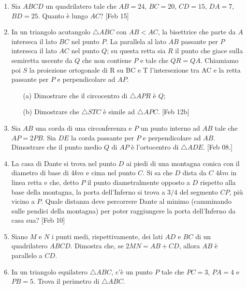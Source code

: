 \documentclass[a4paper]{article}
\theoremstyle{remark}
\theoremstyle{definition}
\begin{document}
\begin{enumerate}
	\item  Sia $ ABCD $ un quadrilatero tale che $ AB = 24 $, $ BC = 20 $, $ CD = 15 $, $ DA = 7 $, $ BD = 25 $. Quanto è lungo $ AC $? [Feb 15] 
	
	\item  In un triangolo acutangolo $ \bigtriangleup ABC $ con $ AB < AC $, la bisettrice che parte da $ A $ interseca il lato $ BC $ nel punto $ P $. La parallela al lato $ AB $ passante per $ P $ interseca il lato $ AC $ nel punto $ Q $; su questa retta sia $ R $ il punto che giace sulla semiretta uscente da $ Q $ che non contiene $ P $ e tale che $ QR = QA $. Chiamiamo poi $ S $ la proiezione ortogonale di R su BC e T l’intersezione tra AC e la
	retta passante per $ P $ e perpendicolare ad $ AP $.
	\begin{itemize}
		\item [(a)] Dimostrare che il circocentro di $ \bigtriangleup APR $ è $ Q $;
		\item [(b)] Dimostrare che $ \bigtriangleup STC $ è simile ad $ \bigtriangleup APC $. [Feb 12b]
	\end{itemize}
	
	\item  Sia $ AB $ una corda di una circonferenza e $ P $ un punto interno ad $ AB $ tale che $ AP = 2PB $. Sia $ DE $ la corda passante per $ P $ e perpendicolare ad $ AB $. Dimostrare che il punto medio $ Q $ di $ AP $ è l’ortocentro di $ \bigtriangleup ADE $. [Feb 08.]
	
	\item La casa di Dante si trova nel punto $ D $ ai piedi di una montagna conica con il diametro di base di $ 4 km $ e cima nel punto $ C $. Si sa che $ D $ dista da $ C $ $ 4 km $ in linea retta e che, detto $ P $ il punto diametralmente opposto a $ D $ rispetto alla base della montagna, la porta dell’Inferno si trova a $ 3/4 $ del segmento $ CP $, più vicino a $ P  $. Quale distanza deve percorrere Dante al minimo (camminando sulle pendici della montagna) per poter raggiungere la porta dell’Inferno da casa sua? [Feb 10]
	
	\item Siano $ M $ e $ N $ i punti medi, rispettivamente, dei lati $ AD $ e $ BC $ di un quadrilatero $ ABCD $. Dimostra che, se $ 2MN = AB + CD $, allora $ AB $ è parallelo a $ CD $.
	
	\item In un triangolo equilatero $ \bigtriangleup ABC $, c'è un punto $ P $ tale che $ PC = 3 $, $ PA = 4 $ e $ PB = 5 $. Trova il perimetro di $ \bigtriangleup ABC $.
\end{enumerate}
\end{document}
